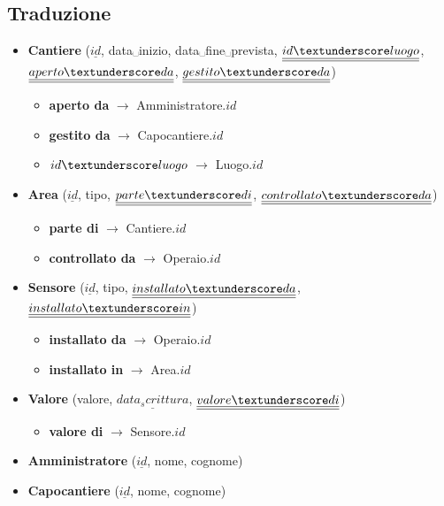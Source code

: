 \documentclass[11pt]{article}
\begin{document}
\subsection*{Traduzione}
\label{sec:org2c2636c}
\begin{itemize}
\item \textbf{Cantiere} (\textbf{\(\underline{id}\)}, data␣inizio, data␣fine␣prevista, \(\underline{\underline{id\textunderscore luogo}}\), \(\underline{\underline{aperto\textunderscore da}}\), \(\underline{\underline{gestito\textunderscore da}}\))
\begin{itemize}
\item \textbf{aperto da} \(\rightarrow\) Amministratore.\(id\)
\item \textbf{gestito da} \(\rightarrow\) Capocantiere.\(id\)
\item \textbf{\(id\textunderscore luogo\)} \(\rightarrow\) Luogo.\(id\)
\end{itemize}
\item \textbf{Area} (\textbf{\(\underline{id}\)}, tipo, \(\underline{\underline{parte\textunderscore di}}\), \(\underline{\underline{controllato\textunderscore da}}\))
\begin{itemize}
\item \textbf{parte di} \(\rightarrow\) Cantiere.\(id\)
\item \textbf{controllato da} \(\rightarrow\) Operaio.\(id\)
\end{itemize}
\item \textbf{Sensore} (\textbf{\(\underline{id}\)}, tipo, \(\underline{\underline{installato\textunderscore da}}\), \(\underline{\underline{installato\textunderscore in}}\))
\begin{itemize}
\item \textbf{installato da} \(\rightarrow\) Operaio.\(id\)
\item \textbf{installato in} \(\rightarrow\) Area.\(id\)
\end{itemize}
\item \textbf{Valore} (valore, \textbf{\(\underline{data_scrittura}\)}, \(\underline{\underline{valore\textunderscore di}}\))
\begin{itemize}
\item \textbf{valore di} \(\rightarrow\) Sensore.\(id\)
\end{itemize}
\item \textbf{Amministratore} (\textbf{\(\underline{id}\)}, nome, cognome)
\item \textbf{Capocantiere} (\textbf{\(\underline{id}\)}, nome, cognome)

\end{itemize}
\end{document}

